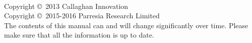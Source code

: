 
  \newpage
  ~\vfill
  \thispagestyle{empty}

  \noindent Copyright \copyright\ 2013 Callaghan Innovation\\ %
  \noindent Copyright \copyright\ 2015-2016 Parresia Research Limited\\ %




  \noindent The contents of this manual can and will change significantly over time.  Please make sure that all the information is up to date.

  \pagestyle{empty} %
  \tableofcontents %
  \cleardoublepage %
  \pagestyle{fancy} %

  \setlength{\parindent}{0pt}
  \setlength{\parskip}{5pt}


